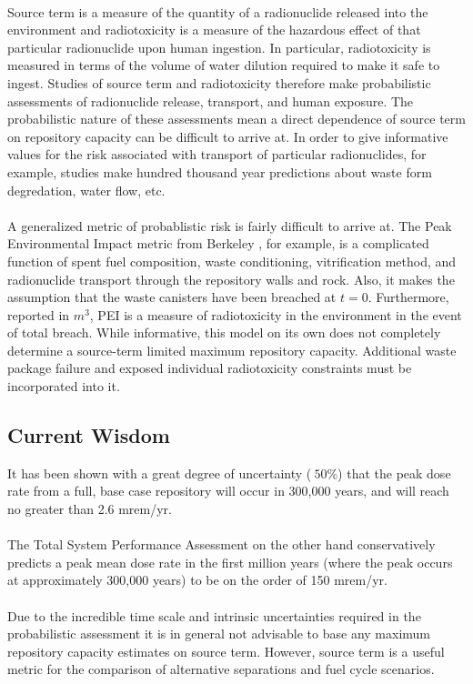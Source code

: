 \paragraph{}
Source term is a measure of the quantity of a radionuclide released into the environment and 
radiotoxicity is a measure of the hazardous effect of that particular radionuclide upon human 
ingestion. In particular, radiotoxicity is measured in terms of the volume of water dilution 
required to make it safe to ingest. Studies of source term and radiotoxicity therefore make 
probabilistic assessments of radionuclide release, transport, and human exposure. The probabilistic 
nature of these assessments mean a direct dependence of source term on repository capacity can be 
difficult to arrive at. In order to give informative values for the risk associated with transport 
of particular radionuclides, for example, studies make hundred thousand year predictions about waste 
form degredation, water flow, etc.  \paragraph{}
A generalized metric of probablistic risk is fairly difficult to arrive at. The Peak Environmental 
Impact metric from Berkeley \cite{bouvier_comparison_2007}, for example, is a complicated function 
of spent fuel composition, waste conditioning, vitrification method, and radionuclide transport 
through the repository walls and rock. Also, it makes the assumption that the waste canisters have 
been breached at $t=0$. Furthermore, reported in $m^3$, PEI is a measure of radiotoxicity in the 
environment in the event of total breach. While informative, this model on its own does not 
completely determine a source-term limited maximum repository capacity. Additional waste package 
failure and exposed individual radiotoxicity constraints must be incorporated into it.
\subsection{Current Wisdom}
It has been shown with a great degree of uncertainty ($~50\%$) that the peak dose rate from a full, 
base case repository will occur in 300,000 years, and will reach no greater than 2.6 
mrem/yr.\cite{li_methodology_2006}
\paragraph{}
The Total System Performance Assessment on the other hand conservatively predicts a peak mean dose 
rate in the first million years (where the peak occurs at approximately 300,000 years) to be on the 
order of 150 mrem/yr.\cite{williams_contract_2001} \paragraph{}
Due to the incredible time scale and intrinsic uncertainties required in the probabilistic 
assessment it is in general not advisable to base any maximum repository capacity estimates on 
source term. However, source term is a useful metric for the comparison of alternative separations 
and fuel cycle scenarios.

